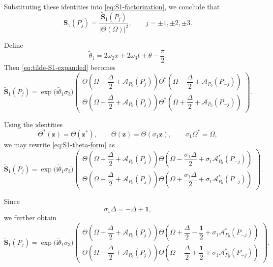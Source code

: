 \documentclass{amsart}
\numberwithin{equation}{hw}
\begin{document}
Substituting these identities into \eqref{eq:S1-factorization}, we conclude that
\begin{equation}
\bm{S}_1(P_j)
=
\frac{
\widetilde{\bm{S}}_1(P_j)
}{
|\Theta(\Omega)|^2
},
\qquad
j=\pm1,\pm2,\pm3.
\label{eq:S1-factorization-2}
\end{equation}

Define
\begin{equation}
\widetilde{\theta}_1
=
2\omega_2x+2\omega_3t+\theta-\frac{\pi}{2}.
\label{eq:g1-definition}
\end{equation}
Then \eqref{eq:tilde-S1-expanded} becomes
\begin{equation}
\widetilde{\bm{S}}_1(P_j)
=
\exp\!\bigl(
\mathrm{i}\widetilde{\theta}_1\sigma_3
\bigr)
\begin{pmatrix}
\Theta\!\left(
\Omega+\dfrac{\Delta}{2}
+\mathcal{A}_{P_0}(P_j)
\right)
\Theta^*\!\left(
\Omega-\dfrac{\Delta}{2}
+\mathcal{A}_{P_0}(P_{-j})
\right)
\\[12pt]
\Theta\!\left(
\Omega-\dfrac{\Delta}{2}
+\mathcal{A}_{P_0}(P_j)
\right)
\Theta^*\!\left(
\Omega+\dfrac{\Delta}{2}
+\mathcal{A}_{P_0}(P_{-j})
\right)
\end{pmatrix}.
\label{eq:S1-theta-form}
\end{equation}

Using the identities
\[
\Theta^*(\bm{z})
=
\Theta(\bm{z}^*),
\qquad
\Theta(\bm{z})
=
\Theta(\sigma_1\bm{z}),
\qquad
\sigma_1\Omega^*
=
\Omega,
\]
we may rewrite \eqref{eq:S1-theta-form} as
\begin{equation}
\widetilde{\bm{S}}_1(P_j)
=
\exp\!\bigl(
\mathrm{i}\widetilde{\theta}_1\sigma_3
\bigr)
\begin{pmatrix}
\Theta\!\left(
\Omega+\dfrac{\Delta}{2}
+\mathcal{A}_{P_0}(P_j)
\right)
\Theta\!\left(
\Omega-\dfrac{\sigma_1\Delta}{2}
+\sigma_1\mathcal{A}_{P_0}^*(P_{-j})
\right)
\\[12pt]
\Theta\!\left(
\Omega-\dfrac{\Delta}{2}
+\mathcal{A}_{P_0}(P_j)
\right)
\Theta\!\left(
\Omega+\dfrac{\sigma_1\Delta}{2}
+\sigma_1\mathcal{A}_{P_0}^*(P_{-j})
\right)
\end{pmatrix}.
\label{eq:S1-theta-symmetry}
\end{equation}

Since
\[
\sigma_1\Delta
=
-\Delta+\bm{1},
\]
we further obtain
\begin{equation}
\widetilde{\bm{S}}_1(P_j)
=
\exp\!\bigl(
\mathrm{i}\widetilde{\theta}_1\sigma_3
\bigr)
\begin{pmatrix}
\Theta\!\left(
\Omega+\dfrac{\Delta}{2}
+\mathcal{A}_{P_0}(P_j)
\right)
\Theta\!\left(
\Omega+\dfrac{\Delta}{2}
-\dfrac{\bm{1}}{2}
+\sigma_1\mathcal{A}_{P_0}^*(P_{-j})
\right)
\\[12pt]
\Theta\!\left(
\Omega-\dfrac{\Delta}{2}
+\mathcal{A}_{P_0}(P_j)
\right)
\Theta\!\left(
\Omega-\dfrac{\Delta}{2}
+\dfrac{\bm{1}}{2}
+\sigma_1\mathcal{A}_{P_0}^*(P_{-j})
\right)
\end{pmatrix}.
\label{eq:S1-final}
\end{equation}
\end{document}
